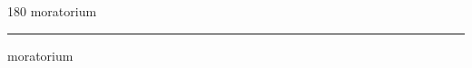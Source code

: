 
\begin{frame}
\begin{center}
\begin{turn}{180}
{\fontsize{2.5cm}{1em}\selectfont moratorium}
\end{turn}
\vspace{1em}\par  
\hrule
\vspace{1em}\par  
{\fontsize{2.5cm}{1em}\selectfont moratorium}
\end{center}
\end{frame}
